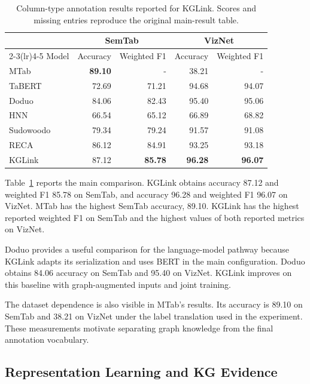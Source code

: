 \begin{table}[tbp]
\centering
\caption{Column-type annotation results reported for KGLink. Scores and missing entries reproduce the original main-result table.}
\label{tab:kglink:main}
\begin{tabular}{lrrrr}
\toprule
&\multicolumn{2}{c}{SemTab}&\multicolumn{2}{c}{VizNet}\\
\cmidrule(lr){2-3}\cmidrule(lr){4-5}
Model&Accuracy&Weighted F1&Accuracy&Weighted F1\\
\midrule
MTab&\textbf{89.10}&-&38.21&-\\
TaBERT&72.69&71.21&94.68&94.07\\
Doduo&84.06&82.43&95.40&95.06\\
HNN&66.54&65.12&66.89&68.82\\
Sudowoodo&79.34&79.24&91.57&91.08\\
RECA&86.12&84.91&93.25&93.18\\
KGLink&87.12&\textbf{85.78}&\textbf{96.28}&\textbf{96.07}\\
\bottomrule
\end{tabular}
\end{table}

Table~\ref{tab:kglink:main} reports the main comparison. KGLink obtains accuracy 87.12 and weighted F1 85.78 on SemTab, and accuracy 96.28 and weighted F1 96.07 on VizNet. MTab has the highest SemTab accuracy, 89.10. KGLink has the highest reported weighted F1 on SemTab and the highest values of both reported metrics on VizNet.

Doduo provides a useful comparison for the language-model pathway because KGLink adapts its serialization and uses BERT in the main configuration. Doduo obtains 84.06 accuracy on SemTab and 95.40 on VizNet. KGLink improves on this baseline with graph-augmented inputs and joint training.

The dataset dependence is also visible in MTab's results. Its accuracy is 89.10 on SemTab and 38.21 on VizNet under the label translation used in the experiment. These measurements motivate separating graph knowledge from the final annotation vocabulary.

\subsection{Representation Learning and KG Evidence}
\label{sec:kglink:ablation}

